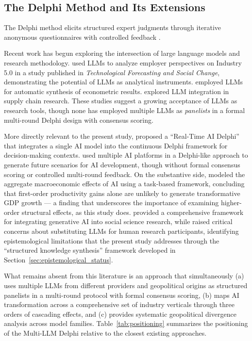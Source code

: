\documentclass[preprint,review,12pt]{elsarticle}
\begin{document}
\subsection{The Delphi Method and Its Extensions}
\label{sec:delphi_method}

The Delphi method elicits structured expert judgments through iterative anonymous questionnaires with controlled feedback \citep{gordon2006rtdelphi}.

Recent work has begun exploring the intersection of large language models and research methodology. \citet{grybauskas2024llm} used LLMs to analyze employer perspectives on Industry 5.0 in a study published in \textit{Technological Forecasting and Social Change}, demonstrating the potential of LLMs as analytical instruments. \citet{guo2026llmsynthesis} employed LLMs for automatic synthesis of econometric results. \citet{liu2026llmsupplychain} explored LLM integration in supply chain research. These studies suggest a growing acceptance of LLMs as research tools, though none has employed multiple LLMs as \textit{panelists} in a formal multi-round Delphi design with consensus scoring.

More directly relevant to the present study, \citet{calleo2025rtaidelphi} proposed a ``Real-Time AI Delphi'' that integrates a single AI model into the continuous Delphi framework for decision-making contexts. \citet{mostashari2025aivisions} used multiple AI platforms in a Delphi-like approach to generate future scenarios for AI development, though without formal consensus scoring or controlled multi-round feedback. On the substantive side, \citet{acemoglu2024simplemacro} modeled the aggregate macroeconomic effects of AI using a task-based framework, concluding that first-order productivity gains alone are unlikely to generate transformative GDP growth --- a finding that underscores the importance of examining higher-order structural effects, as this study does. \citet{bail2024genaisocialscience} provided a comprehensive framework for integrating generative AI into social science research, while \citet{crockett2024llmparticipants} raised critical concerns about substituting LLMs for human research participants, identifying epistemological limitations that the present study addresses through the ``structured knowledge synthesis'' framework developed in Section~\ref{sec:epistemological_status}.

What remains absent from this literature is an approach that simultaneously (a) uses multiple LLMs from different providers and geopolitical origins as structured panelists in a multi-round protocol with formal consensus scoring, (b) maps AI transformation across a comprehensive set of industry verticals through three orders of cascading effects, and (c) provides systematic geopolitical divergence analysis across model families. Table~\ref{tab:positioning} summarizes the positioning of the Multi-LLM Delphi relative to the closest existing approaches.
\end{document}
